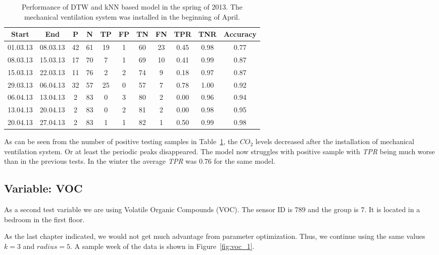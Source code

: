 \begin{table}
  \caption{Performance of DTW and kNN based model in the spring of 2013. The mechanical ventilation system was installed in the beginning of April.} 
  \begin{tabular}{ c | c | c | c | c | c | c | c | c | c | c }
    \hline
   	\textbf{Start} & \textbf{End} & \textbf{P} & \textbf{N} & \textbf{TP} & \textbf{FP} & \textbf{TN} & \textbf{FN} & \textbf{TPR} & \textbf{TNR} & \textbf{Accuracy} \\
	\hline
	01.03.13 & 08.03.13 & 42 & 61 & 19 & 1 & 60 & 23 & 0.45 & 0.98 & 0.77 \\
	08.03.13 & 15.03.13 & 17 & 70 & 7 & 1 & 69 & 10 & 0.41 & 0.99 & 0.87 \\
	15.03.13 & 22.03.13 & 11 & 76 & 2 & 2 & 74 & 9 & 0.18 & 0.97 & 0.87 \\
	29.03.13 & 06.04.13 & 32 & 57 & 25 & 0 & 57 & 7 & 0.78 & 1.00 & 0.92 \\
	06.04.13 & 13.04.13 & 2 & 83 & 0 & 3 & 80 & 2 & 0.00 & 0.96 & 0.94 \\
	13.04.13 & 20.04.13 & 2 & 83 & 0 & 2 & 81 & 2 & 0.00 & 0.98 & 0.95 \\
	20.04.13 & 27.04.13 & 2 & 83 & 1 & 1 & 82 & 1 & 0.50 & 0.99 & 0.98 \\
	\hline
  \end{tabular}
  \label{table:co2_dtwknn_3}
\end{table}

As can be seen from the number of positive testing samples in Table~\ref{table:co2_dtwknn_3}, the $CO_2$ levels decreased after the installation of mechanical ventilation system. Or at least the periodic peaks disappeared. The model now struggles with positive sample with \emph{TPR} being much worse than in the previous tests. In the winter the average \emph{TPR} was $0.76$ for the same model.


\subsection*{Variable: VOC}
As a second test variable we are using Volatile Organic Compounds (VOC). The sensor ID is 789 and the group is 7. It is located in a bedroom in the first floor. 

As the last chapter indicated, we would not get much advantage from parameter optimization. Thus, we continue using the same values $k = 3$ and $radius = 5$. A sample week of the data is shown in Figure~\ref{fig:voc_1}.

